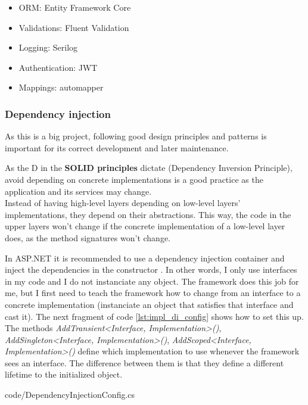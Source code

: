 \begin{itemize}[noitemsep]
\begin{itemize}[noitemsep]
\begin{itemize}[noitemsep]
                                \item ORM: Entity Framework Core
                                \item Validations: Fluent Validation
                                \item Logging: Serilog
                                \item Authentication: JWT
                                \item Mappings: automapper
                            \end{itemize}
                    \end{itemize}
            \end{itemize}

        \subsubsection{Dependency injection}
            As this is a big project, following good design principles and patterns is important for its correct development and later maintenance.

            As the D in the \textbf{SOLID principles} dictate (Dependency Inversion Principle), avoid depending on concrete implementations is a good practice as the application and its services may change. \\
            Instead of having high-level layers depending on low-level layers' implementations, they depend on their abstractions. 
            This way, the code in the upper layers won't change if the concrete implementation of a low-level layer does, as the method signatures won't change.

            In ASP.NET it is recommended to use a dependency injection container and inject the dependencies in the constructor \cite{DI}. 
            In other words, I only use interfaces in my code and I do not instanciate any object. The framework does this job for me, but I first need to 
            teach the framework how to change from an interface to a concrete implementation (instanciate an object that satisfies that interface and cast it).
            The next fragment of code \ref{lst:impl_di_config} shows how to set this up. The methods \textit{AddTransient<Interface, Implementation>()}, \textit{AddSingleton<Interface, Implementation>()}, \textit{AddScoped<Interface, Implementation>()} define 
            which implementation to use whenever the framework sees an interface. The difference between them is that they define a different lifetime to the initialized object. 
            
            {code/DependencyInjectionConfig.cs}
            
